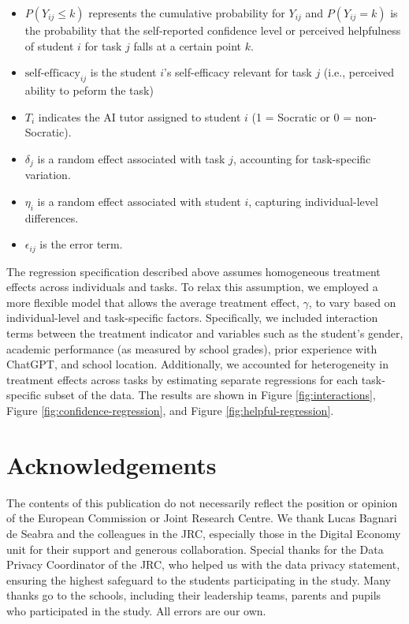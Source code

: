 \documentclass[
  12pt,
]{article}
\begin{document}
\begin{itemize}
\item
  \(P(Y_{ij} \leq k)\) represents the cumulative probability for \(Y_{ij}\) and \(P(Y_{ij} = k)\) is the probability that the self-reported confidence level or perceived helpfulness of student \(i\) for task \(j\) falls at a certain point \(k\).
\item
  \(\text{self-efficacy}_{ij}\) is the student \(i\)'s self-efficacy relevant for task \(j\) (i.e., perceived ability to peform the task)
\item
  \(T_i\) indicates the AI tutor assigned to student \(i\) (1 = Socratic or 0 = non-Socratic).
\item
  \(\delta_j\) is a random effect associated with task \(j\), accounting for task-specific variation.
\item
  \(\eta_i\) is a random effect associated with student \(i\), capturing individual-level differences.
\item
  \(\epsilon_{ij}\) is the error term.
\end{itemize}

The regression specification described above assumes homogeneous treatment effects across individuals and tasks. To relax this assumption, we employed a more flexible model that allows the average treatment effect, \(\gamma\), to vary based on individual-level and task-specific factors. Specifically, we included interaction terms between the treatment indicator and variables such as the student's gender, academic performance (as measured by school grades), prior experience with ChatGPT, and school location. Additionally, we accounted for heterogeneity in treatment effects across tasks by estimating separate regressions for each task-specific subset of the data. The results are shown in Figure \ref{fig:interactions}, Figure \ref{fig:confidence-regression}, and Figure \ref{fig:helpful-regression}.

\section{Acknowledgements}\label{acknowledgements}

The contents of this publication do not necessarily reflect the position or opinion of the European Commission or Joint Research Centre. We thank Lucas Bagnari de Seabra and the colleagues in the JRC, especially those in the Digital Economy unit for their support and generous collaboration. Special thanks for the Data Privacy Coordinator of the JRC, who helped us with the data privacy statement, ensuring the highest safeguard to the students participating in the study. Many thanks go to the schools, including their leadership teams, parents and pupils who participated in the study. All errors are our own.
\end{document}
